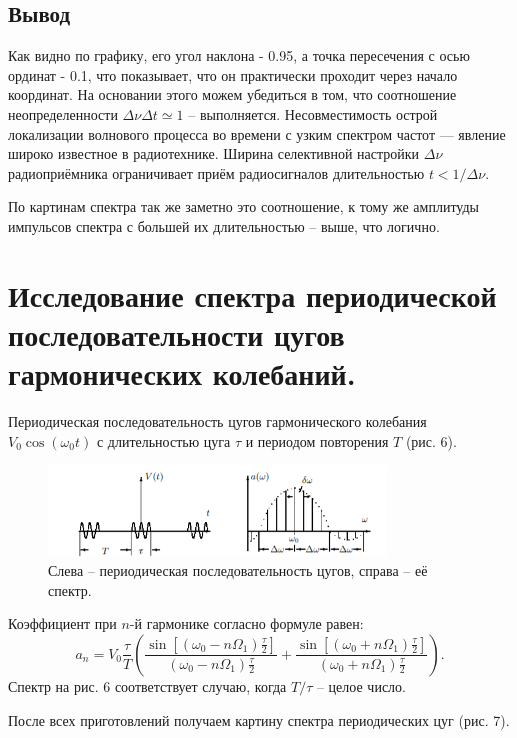 \documentclass[a4paper, 14pt]{extarticle}%
\newcommand\ECaption[1]{%
     \captionsetup{font=footnotesize}%
     \caption{#1}}
\begin{document}
\subsection*{Вывод}

Как видно по графику, его угол наклона - 0.95, а точка пересечения с осью ординат - 0.1, что показывает, что он практически проходит через начало координат. На основании этого можем убедиться в том, что соотношение неопределенности $\Delta\nu\Delta t \simeq 1$ -- выполняется. Несовместимость острой локализации волнового процесса во времени с узким спектром частот — явление широко известное в радиотехнике. Ширина селективной настройки $\Delta\nu$ радиоприёмника ограничивает приём радиосигналов длительностью $t < 1/\Delta\nu$. 

По картинам спектра так же заметно это соотношение, к тому же амплитуды импульсов спектра с большей их длительностью -- выше, что логично. 
\newpage 

\section*{Исследование спектра периодической последовательности
цугов гармонических колебаний.}
Периодическая последовательность цугов гармонического колебания $V_0\cos(\omega_0t)$ с длительностью цуга $\tau$ и периодом повторения $T$ (рис. 6).

\begin{figure}[h!]
\begin{center}
\includegraphics[width=0.8\textwidth]{b}
\end{center}
\ECaption{Слева -- периодическая
последовательность	
цугов, справа  --  её спектр.}
\end{figure}

Коэффициент при $n$-й гармонике согласно формуле равен:
\[a_n = V_0\frac{\tau}{T}\left( \dfrac{\sin[(\omega_0-n\Omega_1)\frac{\tau}{2}]}{(\omega_0-n\Omega_1)\frac{\tau}{2}} + \dfrac{\sin[(\omega_0+n\Omega_1)\frac{\tau}{2}]}{(\omega_0+n\Omega_1)\frac{\tau}{2}}   \right) .\]
Спектр на рис. 6 соответствует случаю, когда $T/\tau$ -- целое число.

После всех приготовлений получаем картину спектра периодических цуг (рис. 7).
\end{document}
